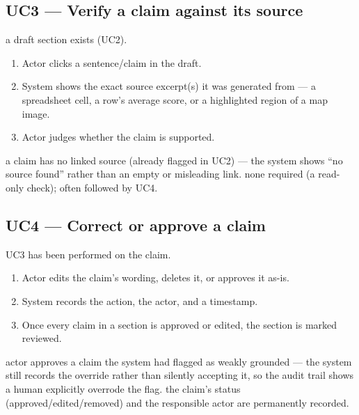 \subsection{UC3 --- Verify a claim against its source}
 a draft section exists (UC2).
\begin{enumerate}
\item Actor clicks a sentence/claim in the draft.
\item System shows the exact source excerpt(s) it was generated from --- a spreadsheet cell, a row's average score, or a highlighted region of a map image.
\item Actor judges whether the claim is supported.
\end{enumerate}
 a claim has no linked source (already flagged in UC2) --- the system shows ``no source found'' rather than an empty or misleading link.
 none required (a read-only check); often followed by UC4.


\subsection{UC4 --- Correct or approve a claim}
 UC3 has been performed on the claim.
\begin{enumerate}
\item Actor edits the claim's wording, deletes it, or approves it as-is.
\item System records the action, the actor, and a timestamp.
\item Once every claim in a section is approved or edited, the section is marked reviewed.
\end{enumerate}
 actor approves a claim the system had flagged as weakly grounded --- the system still records the override rather than silently accepting it, so the audit trail shows a human explicitly overrode the flag.
 the claim's status (approved/edited/removed) and the responsible actor are permanently recorded.

